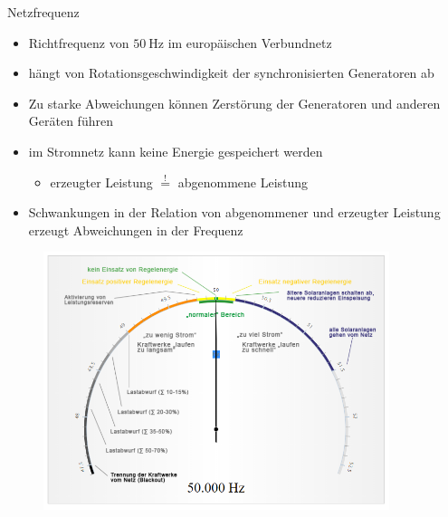 \documentclass[aspectratio=1610, professionalfonts, 9pt]{beamer}
\begin{document}
\begin{frame}{Netzfrequenz}
\begin{itemize}%
\item Richtfrequenz von $\SI{50}{\hertz}$ im europäischen Verbundnetz
\item hängt von Rotationsgeschwindigkeit der synchronisierten Generatoren
ab
\item Zu starke Abweichungen können Zerstörung der Generatoren und anderen Geräten führen
\item im Stromnetz kann keine Energie gespeichert werden
  \begin{itemize}
    \item[\rightarrow]  erzeugter Leistung $\stackrel{!}{=}$ abgenommene Leistung 
  \end{itemize}
  \item Schwankungen in
  der Relation von abgenommener und erzeugter Leistung erzeugt Abweichungen in der Frequenz
\end{itemize}
\end{frame}

{
\begin{frame}
  \begin{figure}
  \includegraphics[width=0.9\textwidth]{images/Frequenz.png}
  \end{figure}
\end{frame}
}
\end{document}
